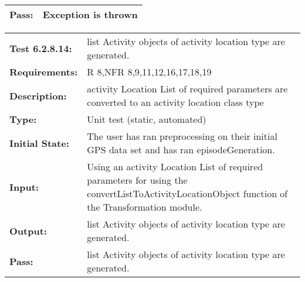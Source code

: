 \documentclass[12pt, titlepage]{article}
\begin{document}
{\begin{tabular}{|l|p{10cm}|}
    \bf{Pass}: & Exception is thrown \\
    \hline
\end{tabular}
\begin{tabular}{|l|p{10cm}|}
    \hline
    \bf{Test} 6.2.8.14: & list Activity objects of activity location type are generated.\\
    \bf{Requirements}: &  R 8,NFR 8,9,11,12,16,17,18,19 \\
    \bf{Description}: & activity Location List of required parameters are converted to an activity location class type\\
    \bf{Type}: & Unit test (static, automated) \\
    \bf{Initial State}: & The user has ran preprocessing on their initial GPS data set and has ran episodeGeneration. \\
    \bf{Input}: & Using an activity Location List of required parameters for using the convertListToActivityLocationObject function of the Transformation module.\\
    \bf{Output}: & list Activity objects of activity location type are generated.\\
    \bf{Pass}: & list Activity objects of activity location type are generated. \\
    \hline
\end{tabular}}
\end{document}
